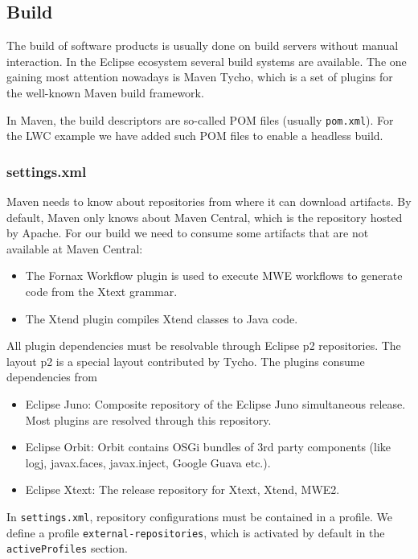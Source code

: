 \subsection{Build} \label{sec:build}

The build of software products is usually done on build servers without manual
interaction. In the Eclipse ecosystem several build systems are available. The
one gaining most attention nowadays is Maven Tycho, which is a set of plugins
for the well-known Maven build framework.

In Maven, the build descriptors are so-called POM files (usually \texttt{pom.xml}). For
the LWC example we have added such POM files to enable a headless build.

\subsubsection{settings.xml}
Maven needs to know about repositories from where it can download artifacts. By
default, Maven only knows about Maven Central, which is the repository hosted by
Apache. For our build we need to consume some artifacts that are not available
at Maven Central:
\begin{itemize} 
\item The Fornax Workflow plugin is used to execute MWE workflows to
generate code from the Xtext grammar.
\item The Xtend plugin compiles Xtend classes to Java code.
\end{itemize} 

All plugin dependencies must be resolvable through Eclipse p2 repositories. The
layout p2 is a special layout contributed by Tycho. The plugins consume
dependencies from
\begin{itemize}
  \item Eclipse Juno: Composite repository of the Eclipse Juno simultaneous
  release. Most plugins are resolved through this repository.
  \item Eclipse Orbit: Orbit contains OSGi bundles of 3rd party components
  (like logj, javax.faces, javax.inject, Google Guava etc.).
  \item Eclipse Xtext: The release repository for Xtext, Xtend, MWE2.
\end{itemize} 

In \texttt{settings.xml}, repository configurations must be contained in a profile. We
define a profile \texttt{external-repositories}, which is activated by default
in the \texttt{activeProfiles} section.

